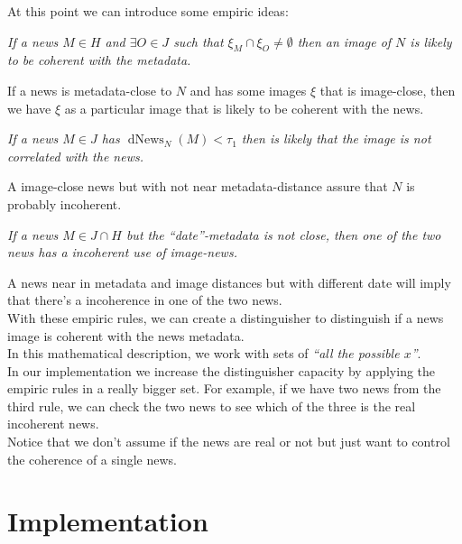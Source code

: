 \documentclass[10pt, journal,twocolumn]{IEEEtran}
\DeclareMathOperator{\distn}{dNews}
\begin{document}
At this point we can introduce some empiric ideas:

\begin{center}
\emph{If a news $M \in H$ and $\exists O \in J$ such that $\xi_M \cap \xi_O \neq \emptyset$ then an image of $N$ is likely to be coherent with the metadata.}
\end{center}

If a news is metadata-close to $N$ and has some images $\xi$ that is image-close, then we have $\xi$ as a particular image that is likely to be coherent with the news.\\[0.2cm]

\begin{center}
\emph{If a news $M \in J$ has $\distn_N(M) < \tau_1$ then is likely that the image is not correlated with the news.}
\end{center}

A image-close news but with not near metadata-distance assure that $N$ is probably incoherent.\\[0.2cm]

\begin{center}
\emph{If a news $M \in J \cap H$ but the ``date''-metadata is not close, then one of the two news has a incoherent use of image-news.} \label{terzocaso}
\end{center}

A news near in metadata and image distances but with different date will imply that there's a incoherence in one of the two news.\\[0.2cm]


With these empiric rules, we can create a distinguisher to distinguish if a news image is coherent with the news metadata.\\[0.1cm]

In this mathematical description, we work with sets of \emph{``all the possible $x$''}.\\
In our implementation we increase the distinguisher capacity by applying the empiric rules in a really bigger set. For example, if we have two news from the third rule, we can check the two news to see which of the three is the real incoherent news.\\
Notice that we don't assume if the news are real or not but just want to control the coherence of a single news.



\section{Implementation}
\end{document}

